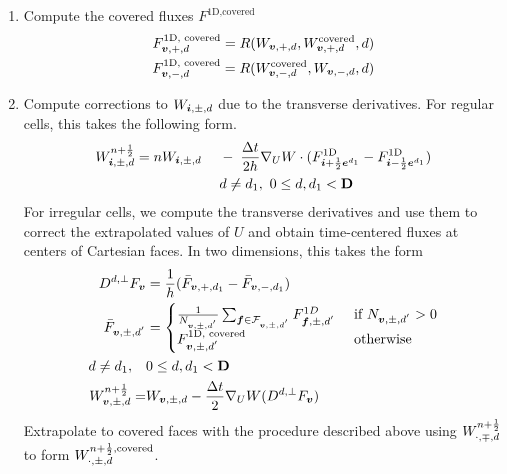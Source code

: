 \begin{enumerate}
\item Compute the covered fluxes $F^{\text{1D}, \text{covered}}$
\begin{equation}
\begin{split}
F^{\text{1D, covered}}_{{\boldsymbol{v}}, +, d} = R(W_{{\boldsymbol{v}}, +, d},
W^{\text{covered}}_{{\boldsymbol{v}}, +, d}, d) \\
F^{\text{1D, covered}}_{{\boldsymbol{v}}, -, d} = R(W^{\text{covered}}_{{\boldsymbol{v}}, -, d},
W_{{\boldsymbol{v}}, -, d}, d)
\end{split}
\label{eqn::coveredflux}
\end{equation}


\item Compute corrections to $W_{{\boldsymbol{i}}, \pm, d}$ due to
the transverse derivatives. For regular cells,
this takes the following form.
\begin{alignat}{2}
\label{eqn::updateprim2-2D}
 W^{n+\frac{1}{2}}_{{\boldsymbol{i}}, \pm, d} = \; & 
n    W_{{\boldsymbol{i}}, \pm, d} \; & & - \; \frac{\Delta t}{2h} \nabla_U W \cdot
 (F^{\text{1D}}_{{\boldsymbol{i}} + \frac{1}{2} {\boldsymbol{e}}^{d_1}}
                       - F^{\text{1D}}_{{\boldsymbol{i}} - \frac{1}{2} {\boldsymbol{e}}^{d_1}}) \\
 & & & d \neq d_1, ~ 0 \le d, d_1 < {\mathbf{D}} \notag \\
\label{eqn::updateprim2-3D}
\end{alignat}
For irregular cells, we compute the transverse derivatives and use them to
correct the extrapolated values of $U$ and obtain time-centered fluxes
at centers of Cartesian faces. In two dimensions, this takes the form
\begin{align}
\begin{split}
 D^{d, \bot} F_{\boldsymbol{v}} &= \frac{1}{h}(
\bar{F}_{{\boldsymbol{v}}, +, d_1} -\bar{F}_{{\boldsymbol{v}}, -, d_1}) \\
 \bar{F}_{{\boldsymbol{v}}, \pm, d^{'}} &= 
\begin{cases}
\frac{1}{N_{{\boldsymbol{v}}, \pm, d^{'}}}
\sum_{{\boldsymbol{f}} \in \mathcal{F}_{{\boldsymbol{v}}, \pm, d^{'}}} F^{1D}_{{\boldsymbol{f}}, \pm, d^{'}}
& \mbox{ if } N_{{\boldsymbol{v}}, \pm, d^{'}} > 0 
\\
F^{\text{1D, covered}}_{{\boldsymbol{v}}, \pm, d^{'}} & \text{ otherwise} \\
\end{cases} 
\\
d \neq d_1, ~~~& 0 \le d, d_1 < {\mathbf{D}}  \\
W^{n + \frac{1}{2}}_{{\boldsymbol{v}}, \pm, d} =& W_{{\boldsymbol{v}}, \pm, d} - \frac{\Delta t}{2}
\nabla_U W (D^{d, \bot} F_{\boldsymbol{v}}) 
\end{split}
\end{align}
Extrapolate to covered faces with the procedure described above using 
$W^{n + \frac{1}{2}}_{\cdot,\mp,d}$ to form $W^{{n + \frac{1}{2}},\text{covered}}_{\cdot,\pm,d}$.


\end{enumerate}
